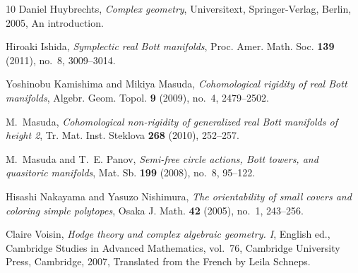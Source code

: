 \documentclass{amsart}
\numberwithin{equation}{section}
\theoremstyle{definition}
\theoremstyle{remark}
\begin{document}
\begin{thebibliography}{10}
Daniel Huybrechts, \emph{Complex geometry}, Universitext, Springer-Verlag,
  Berlin, 2005, An introduction. 

Hiroaki Ishida, \emph{Symplectic real {B}ott manifolds}, Proc. Amer. Math. Soc.
  \textbf{139} (2011), no.~8, 3009--3014. 

Yoshinobu Kamishima and Mikiya Masuda, \emph{Cohomological rigidity of real
  {B}ott manifolds}, Algebr. Geom. Topol. \textbf{9} (2009), no.~4, 2479--2502.

M.~Masuda, \emph{Cohomological non-rigidity of generalized real {B}ott
  manifolds of height 2}, Tr. Mat. Inst. Steklova \textbf{268} (2010),
  252--257. 

M.~Masuda and T.~E. Panov, \emph{Semi-free circle actions, {B}ott towers, and
  quasitoric manifolds}, Mat. Sb. \textbf{199} (2008), no.~8, 95--122.

Hisashi Nakayama and Yasuzo Nishimura, \emph{The orientability of small covers
  and coloring simple polytopes}, Osaka J. Math. \textbf{42} (2005), no.~1,
  243--256. 

Claire Voisin, \emph{Hodge theory and complex algebraic geometry. {I}},
  {E}nglish ed., Cambridge Studies in Advanced Mathematics, vol.~76, Cambridge
  University Press, Cambridge, 2007, Translated from the French by Leila
  Schneps. 

\end{thebibliography}
\end{document}
